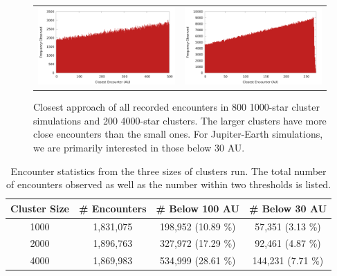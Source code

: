 \documentclass[12pt]{article}
\begin{document}
    \begin{figure}[H]
        \centering
        \caption{Closest approach of all recorded encounters in 800 1000-star cluster 
            simulations and 200 4000-star clusters. The larger clusters have more close
            encounters than the small ones.
            For Jupiter-Earth simulations, we are primarily interested in 
            those below 30 AU. 
        }
        \label{fig:encounter_distance}
        \begin{tabular}{cc}
            \includegraphics[width=3.25in]{encounter_distance_frequency_n1000} &
            \includegraphics[width=3.25in]{encounter_distance_frequency_n4000}
        \end{tabular}
    \end{figure}

    \begin{table}[H]
        \centering
        \caption{Encounter statistics from the three sizes of clusters run.
            The total number of encounters observed as well as the number within
            two thresholds is listed.}
        \vspace{0.2in}

        \begin{tabular}{|cccc|}
            \hline
            \textbf{Cluster Size} & \textbf{\# Encounters} & \textbf{\# Below 100 AU} 
                & \textbf{\# Below 30 AU} \\
            \hline
            1000 & 1,831,075 & 198,952 (10.89 \%) & 57,351 (3.13 \%) \\
            2000 & 1,896,763 & 327,972 (17.29 \%) & 92,461 (4.87 \%) \\
            4000 & 1,869,983 & 534,999 (28.61 \%) & 144,231 (7.71 \%) \\
            \hline
        \end{tabular}
    \end{table}
\end{document}
